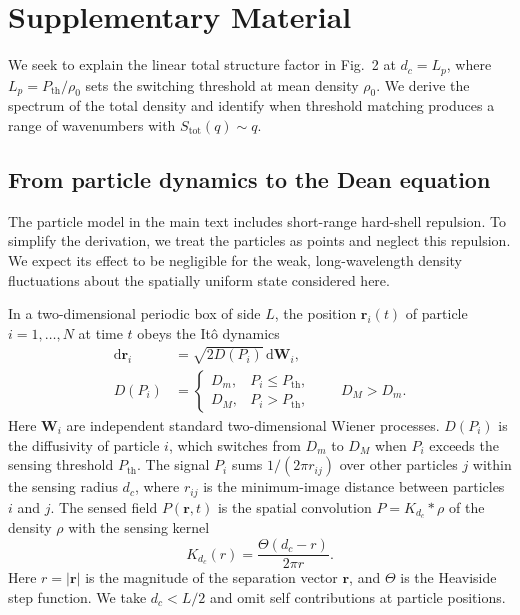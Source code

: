 \documentclass[aps,prl,reprint,letterpaper]{revtex4-2}
\begin{document}
\renewcommand{\theequation}{S\arabic{equation}}

\section*{Supplementary Material}

We seek to explain the linear total structure factor in Fig.~2 at \(d_c=L_p\), where \(L_p=P_{\mathrm{th}}/\rho_0\) sets the switching threshold at mean density \(\rho_0\). We derive the spectrum of the total density and identify when threshold matching produces a range of wavenumbers with \(S_{\mathrm{tot}}(q)\sim q\).

\subsection*{From particle dynamics to the Dean equation}

The particle model in the main text includes short-range hard-shell repulsion. To simplify the derivation, we treat the particles as points and neglect this repulsion. We expect its effect to be negligible for the weak, long-wavelength density fluctuations about the spatially uniform state considered here.

In a two-dimensional periodic box of side \(L\), the position \(\mathbf r_i(t)\) of particle \(i=1,\ldots,N\) at time \(t\) obeys the It\^{o} dynamics
\begin{equation}
    \begin{aligned}
    \mathrm{d}\mathbf r_i &= \sqrt{2D(P_i)}\,\mathrm{d}\mathbf W_i,\\
    D(P_i)&=
    \begin{cases}
    D_m, & P_i\le P_{\mathrm{th}},\\
    D_M, & P_i>P_{\mathrm{th}},
    \end{cases}
    \qquad D_M>D_m .
    \end{aligned}
    \label{eq:qs-particles}
\end{equation}
Here \(\mathbf W_i\) are independent standard two-dimensional Wiener processes. \(D(P_i)\) is the diffusivity of particle \(i\), which switches from \(D_m\) to \(D_M\) when \(P_i\) exceeds the sensing threshold \(P_{\mathrm{th}}\). The signal \(P_i\) sums \(1/(2\pi r_{ij})\) over other particles \(j\) within the sensing radius \(d_c\), where \(r_{ij}\) is the minimum-image distance between particles \(i\) and \(j\). The sensed field \(P(\mathbf r,t)\) is the spatial convolution \(P=K_{d_c}*\rho\) of the density \(\rho\) with the sensing kernel
\begin{equation}
    K_{d_c}(r)=\frac{\Theta(d_c-r)}{2\pi r}.
    \label{eq:qs-kernel}
\end{equation}
Here \(r=|\mathbf r|\) is the magnitude of the separation vector \(\mathbf r\), and \(\Theta\) is the Heaviside step function. We take \(d_c<L/2\) and omit self contributions at particle positions.
\end{document}
